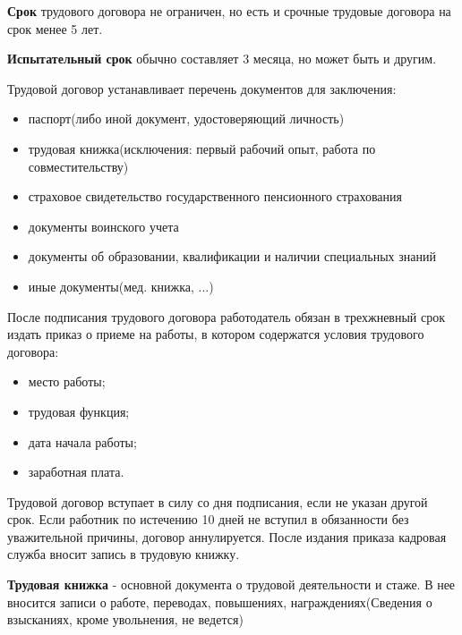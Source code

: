 \documentclass[a5paper,10pt]{article}
\begin{document}
		\textbf{Срок} трудового договора не ограничен, но есть и срочные трудовые договора на срок менее 5 лет.

		\textbf{Испытательный срок} обычно составляет 3 месяца, но может быть и другим.

		Трудовой договор устанавливает перечень документов для заключения:
		\begin{itemize}[itemsep=0pt]
			\item паспорт(либо иной документ, удостоверяющий личность)
			\item трудовая книжка(исключения: первый рабочий опыт, работа по совместительству)
			\item страховое свидетельство государственного пенсионного страхования
			\item документы воинского учета
			\item документы об образовании, квалификации и наличии специальных знаний
			\item иные документы(мед. книжка, ...)
		\end{itemize}

		После подписания трудового договора работодатель обязан в трехжневный срок издать приказ о приеме на работы, в котором содержатся условия трудового договора:
		\begin{itemize}[itemsep=0pt]
			\item место работы;
			\item трудовая функция;
			\item дата начала работы;
			\item заработная плата.
		\end{itemize}

		Трудовой договор вступает в силу со дня подписания, если не указан другой срок. Если работник по истечению 10 дней не вступил в обязанности без уважительной причины, договор аннулируется. После издания приказа кадровая служба вносит запись в трудовую книжку.

		\textbf{Трудовая книжка} - основной документа о трудовой деятельности и стаже. В нее вносится записи о работе, переводах, повышениях, награждениях(Сведения о взысканиях, кроме увольнения, не ведется)
\end{document}
